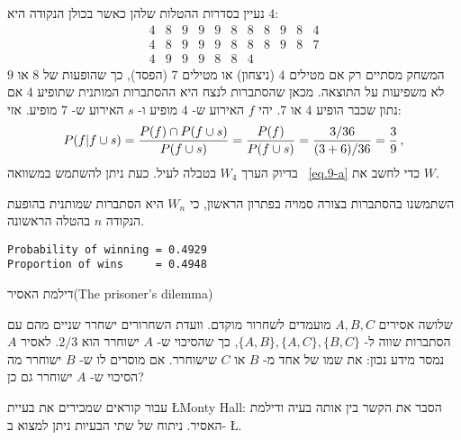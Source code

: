 

נעיין בסדרות ההטלות שלהן כאשר בכולן הנקודה היא
$4$:
\[
\begin{array}{rrrrrrrrrrr}
4 & 8 & 9 & 9 & 9 & 8 & 8 & 8 & 9 & 8 & 4\\
4 & 8 & 9 & 9 & 9 & 8 & 8 & 8 & 9 & 8 & 7\\
4 & 9 & 9 & 9 & 8 & 8 & 4
\end{array}
\]
המשחק מסתיים רק אם מטילים 
$4$
(ניצחון) או מטילים
$7$
(הפסד), כך שהופעות של 
$8$
או
$9$
לא משפיעות על התוצאה. מכאן שהסתברות לנצח היא ההסתברות המותנית שתופיע
$4$
אם נתון שכבר הופיע
$4$
או
$7$. 
יהי 
$f$
האירוע ש-%
$4$
מופיע ו-%
$s$
האירוע ש-%
$7$
מופיע. אזי:
\[
P(f|f\cup s) = \displaystyle\frac{P(f)\cap P(f\cup s)}{P(f\cup s)}=\displaystyle\frac{P(f)}{P(f\cup s)}=\displaystyle\frac{3/36}{(3+6)/36}=\displaystyle\frac{3}{9}\,,
\]
בדיוק הערך
$W_4$
בטבלה לעיל. כעת ניתן להשתמש במשוואה%
~\ref{eq.9-a}
כדי לחשב את
$W$.

השתמשנו בהסתברות בצורה סמויה בפתרון הראשון, כי 
$W_n$
היא הסתברות שמותנית בהופעת הנקודה
$n$
בהטלה הראשונה.

\sml{}
\begin{verbatim}
Probability of winning = 0.4929
Proportion of wins     = 0.4948
\end{verbatim}








\begin{prob}{דילמת האסיר}{}{(The prisoner's dilemma)}

שלושה אסירים 
$A,B,C$
מועמדים לשחרור מוקדם. וועדת השחרורים ישחרר שניים מהם עם הסתברות שווה ל-%
$\{A,B\}, \{A,C\}, \{B,C\}$, 
כך שהסיכוי ש-%
$A$
ישוחרר הוא
$2/3$.
לאסיר 
$A$
נמסר מידע נכון: את שמו של אחד מ-%
$B$
או
$C$
שישוחרר. אם מוסרים לו ש-%
$B$
ישוחרר מה הסיכוי ש-%
$A$
ישוחרר גם כן?

עבור קוראים שמכירים את בעיית 
\L{Monty Hall}:
הסבר את הקשר בין אותה בעיה ודילמת האסיר. ניתוח של שתי הבעיות ניתן למצוא ב-%
\L{\cite{carlton}}.

\end{prob}

